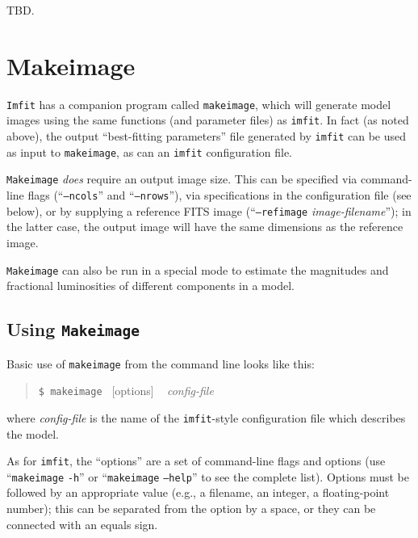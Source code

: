 \documentclass[10pt]{article}
\newcommand{\imfit}{\texttt{imfit}}
\newcommand{\Imfit}{\texttt{Imfit}}
\newcommand{\makeimage}{\texttt{makeimage}}
\newcommand{\Makeimage}{\texttt{Makeimage}}
\begin{document}
TBD.



\section{Makeimage}

\Imfit{} has a companion program called \makeimage, which will generate model
images using the same functions (and parameter files) as \imfit. In fact (as noted above), the
output ``best-fitting parameters'' file generated by \imfit{} can be used as
input to \makeimage, as can an \imfit{} configuration file.

\Makeimage{} \textit{does} require an output image size.  This can be
specified via command-line flags (``\texttt{--ncols}'' and ``\texttt{--nrows}''), via
specifications in the configuration file (see below), or by supplying a
reference FITS image (``\texttt{--refimage} \textit{image-filename}''); in the latter case,
the output image will have the same dimensions as the reference image.

\Makeimage{} can also be run in a special mode to estimate the
magnitudes and fractional luminosities of different components in a
model.


\subsection{Using \Makeimage{}}

Basic use of \makeimage{} from the command line looks like this:
\begin{quote}
  \texttt{\$ \makeimage{} }  [options] ~ \textit{config-file}
\end{quote}
where \textit{config-file} is the name of the \imfit{}-style configuration file
which describes the model.

As for \imfit, the ``options'' are a set of command-line flags and
options (use ``\makeimage{} \texttt{-h}'' or ``\makeimage{} \texttt{--help}'' to
see the complete list). Options must be followed by an appropriate value
(e.g., a filename, an integer, a floating-point number); this can be
separated from the option by a space, or they can be connected with an
equals sign.

\bigskip
\end{document}

